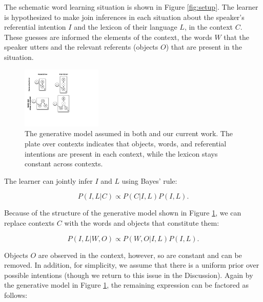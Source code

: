 \documentclass[man,noapacite,12pt]{apa2}
\begin{document}
The schematic word learning situation is shown in Figure \ref{fig:setup}. The learner is hypothesized to make join inferences in each situation about the speaker's referential intention $I$ and the lexicon of their language $L$, in the context $C$. These guesses are informed the elements of the context, the words $W$ that the speaker utters and the relevant referents (objects $O$) that are present in the situation. 


\begin{figure}[tr]
\begin{center}
\includegraphics[width=1.5in]{figures/gen_mod.pdf}
\caption{\label{fig:genmod} The generative model assumed in both \protect{} and our current work. The plate over contexts indicates that objects, words, and referential intentions are present in each context, while the lexicon stays constant across contexts.}
\end{center}
\end{figure}

The learner can jointly infer $I$ and $L$ using Bayes' rule:

\begin{equation}
P( I, L | C) \propto P(C | I, L ) P(I, L).
\end{equation}

\noindent Because of the structure of the generative model shown in Figure \ref{fig:genmod}, we can replace contexts $C$ with the words and objects that constitute them:


\begin{equation}
P( I, L | W, O) \propto P(W, O | I, L) P(I, L).
\end{equation}


\noindent Objects $O$ are observed in the context, however, so are constant and can be removed. In addition, for simplicity, we assume that there is a uniform prior over possible intentions (though we return to this issue in the Discussion). Again by the generative model in Figure \ref{fig:genmod}, the remaining expression can be factored as follows:
\end{document}

